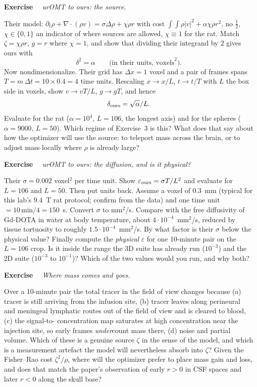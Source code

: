 \documentclass[11pt]{article}
\newcommand{\eps}{\varepsilon}
\newcommand{\dv}{\nabla\cdot}
\newcounter{ex}
\newenvironment{ex}[1]{\refstepcounter{ex}\par\medskip\noindent\textbf{Exercise \theex}\ \ \textit{#1}\par\nopagebreak\smallskip}{\par\medskip}
\begin{document}
\begin{ex}{urOMT to ours: the source.}
Their model: $\partial_t\rho+\dv(\rho v)=\sigma\Delta\rho+\chi\rho r$ with cost
$\int\!\!\int\rho|v|^2+\alpha\chi\rho r^2$, no $\tfrac12$, $\chi\in\{0,1\}$ an indicator
of where sources are allowed, $\chi\equiv1$ for the rat. Match $\zeta=\chi\rho r$, $g=r$ where
$\chi=1$, and show that dividing their integrand by $2$ gives ours with
\[
  \delta^2=\alpha\qquad\text{(in their units, voxels}^2\text{)}.
\]
Now nondimensionalize. Their grid has $\Delta x=1$ voxel and a pair of frames spans
$T=m\,\Delta t=10\times0.4=4$ time units. Rescaling $x\to x/L$, $t\to t/T$ with $L$ the box
side in voxels, show $v\to vT/L$, $g\to gT$, and hence
\[
  \delta_{\rm ours}=\sqrt{\alpha}/L .
\]
Evaluate for the rat ($\alpha=10^4$, $L=106$, the longest axis) and for the spheres
($\alpha=9000$, $L=50$). Which regime of Exercise~3 is this? What does that say about how
the optimizer will use the source: to teleport mass across the brain, or to adjust mass
locally where $\rho$ is already large?
\end{ex}

\begin{ex}{urOMT to ours: the diffusion, and is it physical?}
\label{ex:eps}
Their $\sigma=0.002$ voxel$^2$ per time unit. Show $\eps_{\rm ours}=\sigma T/L^2$ and
evaluate for $L=106$ and $L=50$. Then put units back. Assume a voxel of $0.3$~mm (typical for
this lab's $9.4$~T rat protocol; confirm from the data) and one time unit $=10\,\mathrm{min}/4=150$~s.
Convert $\sigma$ to mm$^2$/s. Compare with the free diffusivity of Gd-DOTA in water at body
temperature, about $4\cdot10^{-4}$~mm$^2$/s, reduced by tissue tortuosity to roughly
$1.5\cdot10^{-4}$~mm$^2$/s. By what factor is their $\sigma$ below the physical value? Finally
compute the \emph{physical} $\eps$ for one 10-minute pair on the $L=106$ crop. Is it inside the
range the 3D suite has already run ($10^{-3}$) and the 2D suite ($10^{-3}$ to $10^{-1}$)?
Which of the two values would you run, and why both?
\end{ex}

\begin{ex}{Where mass comes and goes.}
Over a 10-minute pair the total tracer in the field of view changes because (a) tracer is
still arriving from the infusion site, (b) tracer leaves along perineural and meningeal
lymphatic routes out of the field of view and is cleared to blood, (c) the signal-to-
concentration map saturates at high concentration near the injection site, so early frames
\emph{under}count mass there, (d) noise and partial volume. Which of these is a genuine
source $\zeta$ in the sense of the model, and which is a measurement artefact the model will
nevertheless absorb into $\zeta$? Given the Fisher--Rao cost $\zeta^2/\rho$, where will the
optimizer prefer to place mass gain and loss, and does that match the paper's observation of
early $r>0$ in CSF spaces and later $r<0$ along the skull base?
\end{ex}
\end{document}
